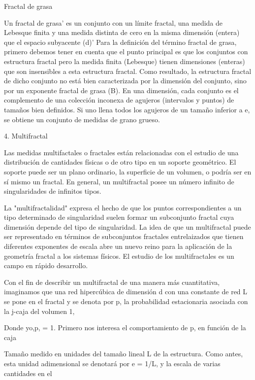 \documentclass[11pt]{article}
\begin{document}
Fractal de grasa

Un fractal de grasa' es un conjunto con un límite fractal, una medida de Lebesque finita y una medida distinta de cero en la misma dimensión (entera) que el espacio subyacente (d)' Para la definición del término fractal de grasa, primero debemos tener en cuenta que el punto principal es que los conjuntos con estructura fractal pero la medida finita (Lebesque) tienen dimensiones (enteras) que son insensibles a esta estructura fractal. Como resultado, la estructura fractal de dicho conjunto no está bien caracterizada por la dimensión del conjunto, sino por un exponente fractal de grasa (B). En una dimensión, cada conjunto es el complemento de una colección inconexa de agujeros (intervalos y puntos) de tamaños bien definidos. Si uno llena todos los agujeros de un tamaño inferior a e, se obtiene un conjunto de medidas de grano grueso.

4. Multifractal

Las medidas multifactales o fractales están relacionadas con el estudio de una distribución de cantidades físicas o de otro tipo en un soporte geométrico. El soporte puede ser un plano ordinario, la superficie de un volumen, o podría ser en sí mismo un fractal. En general, un multifractal posee un número infinito de singularidades de infinitos tipos. 

La "multifractalidad" expresa el hecho de que los puntos correspondientes a un tipo determinado de singularidad suelen formar un subconjunto fractal cuya dimensión depende del tipo de singularidad. La idea de que un multifractal puede ser representado en términos de subconjuntos fractales entrelaizados que tienen diferentes exponentes de escala abre un nuevo reino para la aplicación de la geometría fractal a los sistemas físicos. El estudio de los multifractales es un campo en rápido desarrollo.

Con el fin de describir un multifractal de una manera más cuantitativa, imaginamos que una red hipercúbica de dimensión d con una constante de red L se pone en el fractal y se denota por p, la probabilidad estacionaria asociada con la j-caja del volumen 1,

Donde yo,p, = 1. Primero nos interesa el comportamiento de p, en función de la caja

Tamaño medido en unidades del tamaño lineal L de la estructura. Como antes, esta unidad adimensional se denotará por e = 1/L, y la escala de varias cantidades en el

\end{document}
